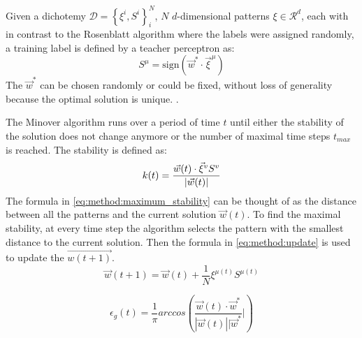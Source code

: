 Given a dichotemy $\mathcal{D} = \left\{\xi^i, S^i \right\}_{i}^{N}$, $N$ $d$-dimensional patterns $\xi \in \mathcal{R}^d$, each with in contrast to the Rosenblatt algorithm where the labels were assigned randomly, a training label is defined by a teacher perceptron as:
\begin{equation}
	S^\mu = \text{sign}(\vec{w}^* \cdot {\vec{\xi}}^{\mu})
\end{equation}
The $\vec{w}^*$ can be chosen randomly or could be fixed, without loss of generality because the optimal solution is unique. .

The Minover algorithm runs over a period of time $t$ until either the stability of the solution does not change anymore or the number of maximal time steps $t_{max}$ is reached. The  stability is defined as: 
\begin{equation}\label{eq:method:maximum_stability}
\mathnormal{k}(t) = \frac{\vec{w}(t) \cdot \vec{\xi}^v S^v}{|\vec{w}(t)|}
\end{equation} 
The formula in \eqref{eq:method:maximum_stability} can be thought of as the distance between all the patterns and the current solution $\vec{w}(t)$. To find the maximal stability, at every time step the algorithm selects the pattern with the smallest distance to the current solution. Then the formula in \eqref{eq:method:update} is used to update the $\vec{w(t + 1)}$.
\begin{equation}\label{eq:method:update}
	\vec{w}(t + 1) = \vec{w}(t) + \frac{1}{N} \xi^{\mu(t)} S^{\mu(t)} 
\end{equation}

\begin{equation}\label{eq:method:generalization_error}
	\epsilon_g(t) = \frac{1}{\pi} arccos (\frac{\vec{w}(t) \cdot \vec{w}^*}{|\vec{w}(t)| |\vec{w}^*}|)
\end{equation}